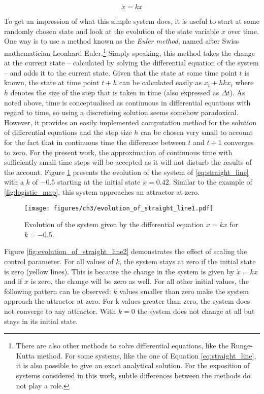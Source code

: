 \begin{equation}
\dot{x} = kx
\label{eq:straight_line}
\end{equation}

To get an impression of what this simple system does, it is useful to start at some randomly chosen state and look at the evolution of the state variable $x$ over time. One way is to use a method known as the \emph{Euler method}, named after Swiss mathematician Leonhard Euler.\footnote{There are also other methods to solve differential equations, like the Runge-Kutta method. For some systems, like the one of Equation \ref{eq:straight_line}, it is also possible to give an exact analytical solution. For the exposition of systems considered in this work, subtle differences between the methods do not play a role.} Simply speaking, this method takes the change at the current state -- calculated by solving the differential equation of the system -- and adds it to the current state. Given that the state at some time point $t$ is known, the state at time point $t+h$ can be calculated easily as $x_t + hkx_t$ \citep{Fuchs2013} where $h$ denotes the size of the step that is taken in time (also expressed as $\Delta t$). As noted above, time is conceptualised as continuous in differential equations with regard to time, so using a discretising solution seems somehow paradoxical. However, it provides an easily implemented computation method for the solution of differential equations and the step size $h$ can be chosen very small to account for the fact that in continuous time the difference between $t$ and $t+1$ converges to zero. For the present work, the approximation of continuous time with sufficiently small time steps will be accepted as it will not disturb the results of the account. Figure \ref{fig:evolution_of_straight_line1} presents the evolution of the system of \ref{eq:straight_line} with a $k$ of $-0.5$ starting at the initial state $x = 0.42$. Similar to the example of \ref{fig:logistic_map}, this system approaches an attractor at zero.

\begin{figure}
\texttt{[image: figures/ch3/evolution\_of\_straight\_line1.pdf]}
\caption{Evolution of the system given by the differential equation $\dot{x} = kx$ for $k = -0.5$.}
\label{fig:evolution_of_straight_line1}
\end{figure}

Figure \ref{fig:evolution_of_straight_line2} demonstrates the effect of scaling the control parameter. For all values of $k$, the system stays at zero if the initial state is zero (yellow lines). This is because the change in the system is given by $\dot{x} = kx$ and if $x$ is zero, the change will be zero as well. For all other initial values, the following pattern can be observed: $k$ values smaller than zero make the system approach the attractor at zero. For k values greater than zero, the system does not converge to any attractor. With $k = 0$ the system does not change at all but stays in its initial state. 

